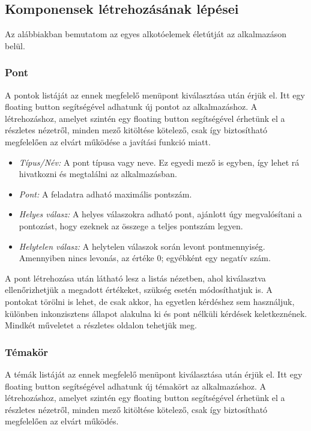 \subsection{Komponensek létrehozásának lépései}

Az alábbiakban bemutatom az egyes alkotóelemek életútját az alkalmazáson belül.

\subsubsection{Pont}

A pontok listáját az ennek megfelelő menüpont kiválasztása után érjük el.
Itt egy floating button segítségével adhatunk új pontot az alkalmazáshoz.
A létrehozáshoz, amelyet szintén egy floating button segítségével érhetünk el a részletes nézetről, minden mező kitöltése kötelező, csak így biztosítható megfelelően az elvárt működése a javítási funkció miatt.

\begin{itemize}
    \item \emph{Típus/Név:} A pont típusa vagy neve. Ez egyedi mező is egyben, így lehet rá hivatkozni és megtalálni az alkalmazásban.
    \item \emph{Pont:} A feladatra adható maximális pontszám.
    \item \emph{Helyes válasz:} A helyes válaszokra adható pont, ajánlott úgy megvalósítani a pontozást, hogy ezeknek az összege a teljes pontszám legyen.
    \item \emph{Helytelen válasz:} A helytelen válaszok során levont pontmennyiség. Amennyiben nincs levonás, az értéke 0; egyébként egy negatív szám.
\end{itemize}

A pont létrehozása után látható lesz a listás nézetben, ahol kiválasztva ellenőrizhetjük a megadott értékeket, szükség esetén módosíthatjuk is.
A pontokat törölni is lehet, de csak akkor, ha egyetlen kérdéshez sem használjuk, különben inkonzisztens állapot alakulna ki és pont nélküli kérdések keletkeznének.
Mindkét műveletet a részletes oldalon tehetjük meg.

\subsubsection{Témakör}

A témák listáját az ennek megfelelő menüpont kiválasztása után érjük el.
Itt egy floating button segítségével adhatunk új témakört az alkalmazáshoz.
A létrehozáshoz, amelyet szintén egy floating button segítségével érhetünk el a részletes nézetről, minden mező kitöltése kötelező, csak így biztosítható megfelelően az elvárt működés.

